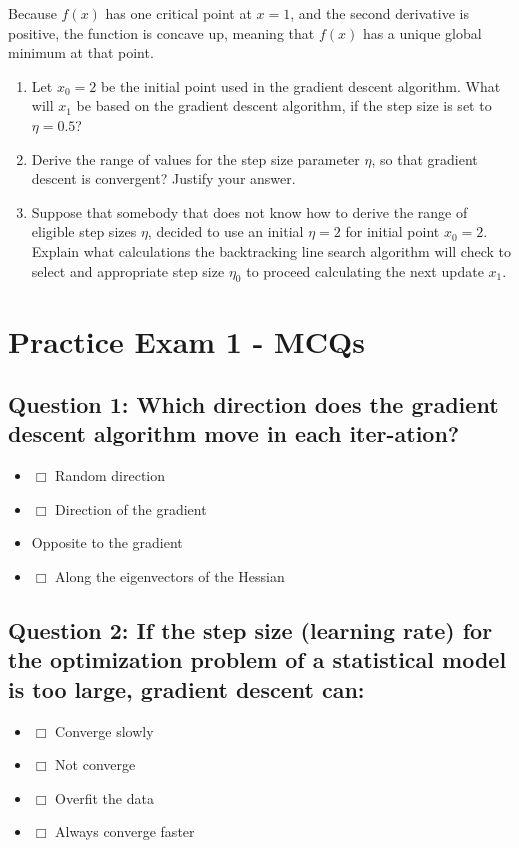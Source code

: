 \documentclass[
  letterpaper,
  DIV=11,
  numbers=noendperiod]{scrartcl}
\providecommand{\tightlist}{%
  \setlength{\itemsep}{0pt}\setlength{\parskip}{0pt}}\usepackage{longtable,booktabs,array}
\begin{document}
Because \(f(x)\) has one critical point at \(x=1\), and the second
derivative is positive, the function is concave up, meaning that
\(f(x)\) has a unique global minimum at that point.

\begin{enumerate}
\def\labelenumi{\arabic{enumi}.}
\setcounter{enumi}{1}
\item
  Let \(x_0 = 2\) be the initial point used in the gradient descent
  algorithm. What will \(x_1\) be based on the gradient descent
  algorithm, if the step size is set to \(η = 0.5\)?
\item
  Derive the range of values for the step size parameter \(η\), so that
  gradient descent is convergent? Justify your answer.
\item
  Suppose that somebody that does not know how to derive the range of
  eligible step sizes \(η\), decided to use an initial \(η = 2\) for
  initial point \(x_0 = 2\). Explain what calculations the backtracking
  line search algorithm will check to select and appropriate step size
  \(η_0\) to proceed calculating the next update \(x_1\).
\end{enumerate}

\section{Practice Exam 1 - MCQs}\label{practice-exam-1---mcqs}

\subsection{Question 1: Which direction does the gradient descent
algorithm move in each
iter-ation?}\label{question-1-which-direction-does-the-gradient-descent-algorithm-move-in-each-iter-ation}

\begin{itemize}
\tightlist
\item
  \(\Box\) Random direction
\item
  \(\Box\) Direction of the gradient
\item
   Opposite to the gradient
\item
  \(\Box\) Along the eigenvectors of the Hessian
\end{itemize}

\subsection{Question 2: If the step size (learning rate) for the
optimization problem of a statistical model is too large, gradient
descent
can:}\label{question-2-if-the-step-size-learning-rate-for-the-optimization-problem-of-a-statistical-model-is-too-large-gradient-descent-can}

\begin{itemize}
\tightlist
\item
  \(\Box\) Converge slowly
\item
  \(\Box\) Not converge
\item
  \(\Box\) Overfit the data
\item
  \(\Box\) Always converge faster
\end{itemize}
\end{document}
